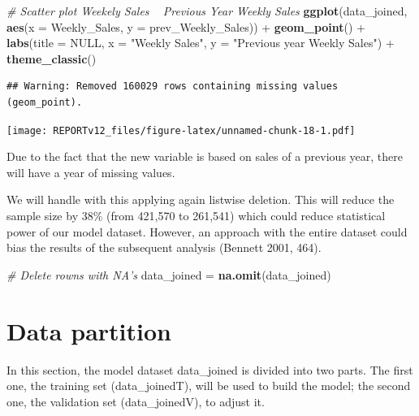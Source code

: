 \documentclass[11pt,]{article}
\newenvironment{Shaded}{\begin{snugshade}}{\end{snugshade}}
\newcommand{\KeywordTok}[1]{\textcolor[rgb]{0.13,0.29,0.53}{\textbf{{#1}}}}
\newcommand{\DataTypeTok}[1]{\textcolor[rgb]{0.13,0.29,0.53}{{#1}}}
\newcommand{\StringTok}[1]{\textcolor[rgb]{0.31,0.60,0.02}{{#1}}}
\newcommand{\CommentTok}[1]{\textcolor[rgb]{0.56,0.35,0.01}{\textit{{#1}}}}
\newcommand{\OtherTok}[1]{\textcolor[rgb]{0.56,0.35,0.01}{{#1}}}
\newcommand{\NormalTok}[1]{{#1}}
\begin{document}
\begin{Shaded}
\begin{Highlighting}[]
\CommentTok{# Scatter plot Weekely Sales ~ Previous Year Weekly Sales}
\KeywordTok{ggplot}\NormalTok{(data_joined, }\KeywordTok{aes}\NormalTok{(}\DataTypeTok{x =} \NormalTok{Weekly_Sales, }\DataTypeTok{y =} \NormalTok{prev_Weekly_Sales)) +}\StringTok{ }
\StringTok{    }\KeywordTok{geom_point}\NormalTok{() +}\StringTok{ }\KeywordTok{labs}\NormalTok{(}\DataTypeTok{title =} \OtherTok{NULL}\NormalTok{, }\DataTypeTok{x =} \StringTok{"Weekly Sales"}\NormalTok{, }\DataTypeTok{y =} \StringTok{"Previous year Weekly Sales"}\NormalTok{) +}\StringTok{ }
\StringTok{    }\KeywordTok{theme_classic}\NormalTok{()}
\end{Highlighting}
\end{Shaded}

\begin{verbatim}
## Warning: Removed 160029 rows containing missing values (geom_point).
\end{verbatim}

\texttt{[image: REPORTv12\_files/figure-latex/unnamed-chunk-18-1.pdf]}

Due to the fact that the new variable is based on sales of a previous
year, there will have a year of missing values.

We will handle with this applying again listwise deletion. This will
reduce the sample size by 38\% (from 421,570 to 261,541) which could
reduce statistical power of our model dataset. However, an approach with
the entire dataset could bias the results of the subsequent analysis
(Bennett 2001, 464).

\begin{Shaded}
\begin{Highlighting}[]
\CommentTok{# Delete rowns with NA's}
\NormalTok{data_joined =}\StringTok{ }\KeywordTok{na.omit}\NormalTok{(data_joined)}
\end{Highlighting}
\end{Shaded}

\section{Data partition}\label{data-partition}

In this section, the model dataset data\_joined is divided into two
parts. The first one, the training set (data\_joinedT), will be used to
build the model; the second one, the validation set (data\_joinedV), to
adjust it.
\end{document}
